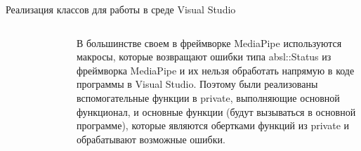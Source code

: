 \documentclass[aspectratio=169,xcolor=dvipsnames]{beamer}
\begin{document}

\begin{frame}{Реализация классов для работы в среде Visual Studio}
    \begin{columns}[c] %

        \begin{figure}[h]
            \label{ris:subgraph}
        \end{figure}

        В большинстве своем в фреймворке MediaPipe используются макросы, которые возвращают ошибки типа absl::Status из фреймворка MediaPipe и их нельзя обработать напрямую в коде программы в Visual Studio. Поэтому были реализованы вспомогательные функции в private, выполняющие основной функционал, и основные функции (будут вызываться в основной программе), которые являются обертками функций из private и обрабатывают возможные ошибки.

    \end{columns}
\end{frame}
\end{document}

